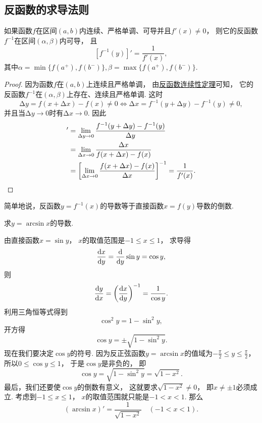 \subsection{反函数的求导法则}
\begin{theorem}
如果函数\(f\)在区间\((a,b)\)内连续、严格单调、可导并且\(f'(x)\neq0\)，
则它的反函数\(f^{-1}\)在区间\((\alpha,\beta)\)内可导，
且\[
	[f^{-1}(y)]'=\frac1{f'(x)},
\]
其中\(\alpha=\min\{f(a^+),f(b^-)\},
\beta=\max\{f(a^+),f(b^-)\}\).
\begin{proof}
因为函数\(f\)在\((a,b)\)上连续且严格单调，
由\hyperref[theorem:极限.连续函数的极限2]{反函数连续性定理}可知，
它的反函数\(f^{-1}\)在\((\alpha,\beta)\)上存在、连续且严格单调.
这时\[
	\increment y = f(x + \increment x) - f(x) \neq 0
	\iff
	\increment x = f^{-1}(y + \increment y) - f^{-1}(y) \neq 0,
\]
并且当\(\increment y \to 0\)时有\(\increment x \to 0\).
因此\begin{align*}
	[f^{-1}(y)]'
	&= \lim_{\increment y \to 0}
		\frac{f^{-1}(y + \increment y) - f^{-1}(y)}{\increment y} \\
	&= \lim_{\increment x \to 0}
		\frac{\increment x}{f(x + \increment x) - f(x)} \\
	&= \left[
		\lim_{\increment x \to 0}
		\frac{f(x + \increment x) - f(x)}{\increment x}
	\right]^{-1}
	= \frac1{f'(x)}.
	\qedhere
\end{align*}
\end{proof}
\end{theorem}

简单地说，反函数\(y=f^{-1}(x)\)的导数等于直接函数\(x=f(y)\)导数的倒数.

\begin{example}
求\(y=\arcsin x\)的导数.
\begin{solution}
由直接函数\(x=\sin y\)，
\(x\)的取值范围是\(-1 \leq x \leq 1\)，
求导得\[
	\dv{x}{y}
	= \dv{y} \sin y
	= \cos y,
\]
则\[
	\dv{y}{x}
	= \left(\dv{x}{y}\right)^{-1}
	= \frac1{\cos y}.
\]
利用三角恒等式得到\[
	\cos^2 y = 1 - \sin^2 y,
\]
开方得\[
	\cos y = \pm\sqrt{1 - \sin^2 y}.
\]
现在我们要决定\(\cos y\)的符号.
因为反正弦函数\(y = \arcsin x\)的值域为\(-\frac\pi2 \leq y \leq \frac\pi2\)，
所以\(0 \leq \cos y \leq 1\)，
于是\(\cos y\)是非负的，
即\[
	\cos y
	= \sqrt{1 - \sin^2 y}
	= \sqrt{1 - x^2}.
\]
最后，我们还要使\(\cos y\)的倒数有意义，
这就要求\(\sqrt{1-x^2}\neq0\)，
即\(x\neq\pm1\)必须成立.
考虑到\(-1 \leq x \leq 1\)，
\(x\)的取值范围就只能是\(-1 < x < 1\).
那么\[
	(\arcsin x)' = \frac1{\sqrt{1 - x^2}}
	\quad(-1<x<1).
\]
\end{solution}
\end{example}

